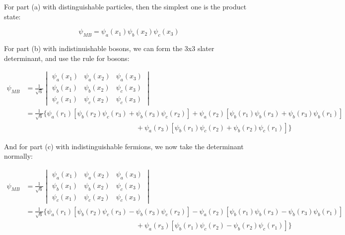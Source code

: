 \documentclass[10pt]{article}
\begin{document}
    \begin{solution}
        For part (a) with distinguishable particles, then the simplest one is the product state: 

        \[ \psi_{MB} = \psi_a(x_1)\psi_b(x_2)\psi_c(x_3)\]

        For part (b) with indistinuishable bosons, we can form the 3x3 slater determinant, and use the rule for bosons: 

        \begin{align*}
            \psi_{MB} &= \frac{1}{\sqrt{6}}\begin{vmatrix}
                \psi_a(x_1) & \psi_a(x_2) & \psi_a(x_3) \\
                \psi_b(x_1) & \psi_b(x_2) & \psi_c(x_3) \\
                \psi_c(x_1) & \psi_c(x_2) & \psi_c(x_3) 
                \end{vmatrix}\\
                &= \frac{1}{\sqrt{6}}\bigg \{ \psi_a(r_1)\left[ \psi_b(r_2)\psi_c(r_3) + \psi_b(r_3)\psi_c(r_2)\right] + \psi_a(r_2)\left[ \psi_b(r_1)\psi_b(r_3) + \psi_b(r_3)\psi_b(r_1)\right]\\
                & \phantom{aaaaaaaaaaaaaaaaaaaaaaaaaaaaaa} + \psi_a(r_3)\left[ \psi_b(r_1)\psi_c(r_2) + \psi_b(r_2)\psi_c(r_1)\right] \bigg \}
        \end{align*}

        And for part (c) with indistinguishable fermions, we now take the determinant normally: 

        \begin{align*}
            \psi_{MB} &= \frac{1}{\sqrt{6}}\begin{vmatrix}
                \psi_a(x_1) & \psi_a(x_2) & \psi_a(x_3) \\
                \psi_b(x_1) & \psi_b(x_2) & \psi_c(x_3) \\
                \psi_c(x_1) & \psi_c(x_2) & \psi_c(x_3) 
                \end{vmatrix}\\
                &= \frac{1}{\sqrt{6}}\bigg \{ \psi_a(r_1)\left[ \psi_b(r_2)\psi_c(r_3) - \psi_b(r_3)\psi_c(r_2)\right] - \psi_a(r_2)\left[ \psi_b(r_1)\psi_b(r_3) - \psi_b(r_3)\psi_b(r_1)\right] && \\
                & \phantom{aaaaaaaaaaaaaaaaaaaaaaaaaaaaaa} + \psi_a(r_3)\left[ \psi_b(r_1)\psi_c(r_2) - \psi_b(r_2)\psi_c(r_1)\right] \bigg \}
        \end{align*}
        
    \end{solution}
\end{document}
